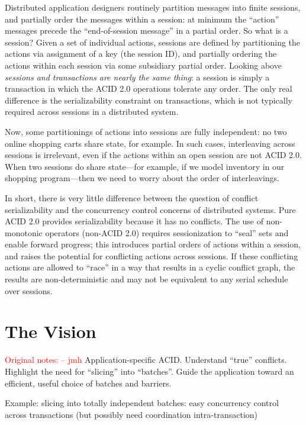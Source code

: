 \documentclass{sig-alternate}
\newcommand{\jmh}[1]{{\textcolor{red}{#1 -- jmh}}}
\begin{document}
Distributed application designers routinely partition messages into finite
sessions, and partially order the messages within a session: at minimum the
``action'' messages precede the ``end-of-session message'' in a partial order.
So what is a session?  Given a set of individual actions, sessions are defined
by partitioning the actions via assignment of a key (the session ID), and
partially ordering the actions within each session via some subsidiary partial
order.  Looking above \emph{sessions and transactions are nearly the same
  thing}: a session is simply a transaction in which the ACID 2.0 operations
tolerate any order.  The only real difference is the serializability constraint
on transactions, which is not typically required across sessions in a
distributed system.

Now, some partitionings of actions into sessions are fully independent: no two
online shopping carts share state, for example.  In such cases, interleaving
across sessions is irrelevant, even if the actions within an open session are
not ACID 2.0.  When two sessions do share state---for example, if we model
inventory in our shopping program---then we need to worry about the order of
interleavings.

In short, there is very little difference between the question of conflict
serializability and the concurrency control concerns of distributed systems.
Pure ACID 2.0 provides serializability because it has no conflicts.  The use of
non-monotonic operators (non-ACID 2.0) requires sessionization to ``seal'' sets
and enable forward progress; this introduces partial orders of actions within a
session, and raises the potential for conflicting actions across sessions.  If
these conflicting actions are allowed to ``race'' in a way that results in a
cyclic conflict graph, the results are non-deterministic and may not be
equivalent to any serial schedule over sessions.


\section{The Vision}
\jmh{Original notes:}  
Application-specific ACID.  Understand ``true'' conflicts.  Highlight the need
for ``slicing'' into ``batches''.  Guide the application toward an efficient,
useful choice of batches and barriers.

Example: slicing into totally independent batches: easy concurrency control
across transactions (but possibly need coordination intra-transaction)
\end{document}
